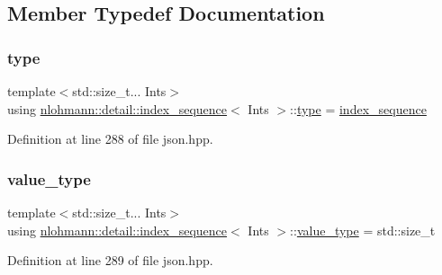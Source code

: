 \subsection{Member Typedef Documentation}
\mbox{\label{structnlohmann_1_1detail_1_1index__sequence_a3c14c4ab277de72b166806193ff4fa10}} 
\subsubsection{\texorpdfstring{type}{type}}
{\footnotesize\ttfamily template$<$std\+::size\+\_\+t... Ints$>$ \\
using \hyperlink{structnlohmann_1_1detail_1_1index__sequence}{nlohmann\+::detail\+::index\+\_\+sequence}$<$ Ints $>$\+::\hyperlink{structnlohmann_1_1detail_1_1index__sequence_a3c14c4ab277de72b166806193ff4fa10}{type} =  \hyperlink{structnlohmann_1_1detail_1_1index__sequence}{index\+\_\+sequence}}



Definition at line 288 of file json.\+hpp.

\mbox{\label{structnlohmann_1_1detail_1_1index__sequence_a2eca43d08fc1eb68bd5fa75b6714d21d}} 
\subsubsection{\texorpdfstring{value\+\_\+type}{value\_type}}
{\footnotesize\ttfamily template$<$std\+::size\+\_\+t... Ints$>$ \\
using \hyperlink{structnlohmann_1_1detail_1_1index__sequence}{nlohmann\+::detail\+::index\+\_\+sequence}$<$ Ints $>$\+::\hyperlink{structnlohmann_1_1detail_1_1index__sequence_a2eca43d08fc1eb68bd5fa75b6714d21d}{value\+\_\+type} =  std\+::size\+\_\+t}



Definition at line 289 of file json.\+hpp.



